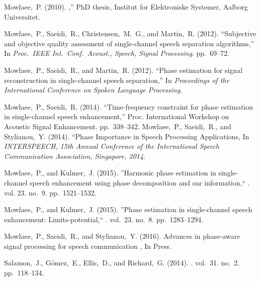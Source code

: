  Mowlaee,~P. (2010). ,'' \newblock PhD thesis, Institut for
Elektroniske Systemer, Aalborg Universitet.

 Mowlaee,~P., Saeidi,~R., Christensen,~M.~G.,
and Martin,~R. (2012). \newblock ``Subjective and objective quality assessment of
single-channel speech separation algorithms,'' \newblock In {\em Proc.\ IEEE
Int.\ Conf.\ Acoust., Speech, Signal Processing}. pp.~69--72.

 Mowlaee,~P., Saeidi,~R., and Martin,~R. (2012).
\newblock ``Phase estimation for signal reconstruction in single-channel speech
separation,'' \newblock In {\em Proceedings of the International Conference on
Spoken Language Processing}.

 Mowlaee,~P., Saeidi,~R. (2014). ``Time-frequency
constraint for phase estimation in single-channel speech enhancement,'' Proc.
International Workshop on Acoustic Signal Enhancement. pp.~338--342.
%
 Mowlaee,~P., Saeidi,~R., and Stylianou,~Y. (2014).
\newblock ``Phase Importance in Speech Processing Applications, \newblock In {\em
{INTERSPEECH}, 15th Annual Conference of the International Speech Communication
Association, Singapore, 2014}.

 Mowlaee,~P., and
Kulmer,~J. (2015). \newblock ''Harmonic phase estimation in single-channel speech
enhancement using phase decomposition and snr information,`` .
vol. 23. no.~9. pp.~1521--1532.

 Mowlaee,~P., and Kulmer,~J. (2015).
\newblock ''Phase estimation in single-channel speech
enhancement: Limits-potential,`` . vol.~23. no.~8. pp.~1283--1294.

 Mowlaee,~P., Saeidi,~R., and Stylianou,~Y. (2016).
\newblock Advances in phase-aware signal processing for speech communication
, In Press.



 Salamon,~J., G{\'o}mez,~E., Ellis,~D., and Richard,~G. (2014).
. vol.~31. no.~2. pp.~118--134.

